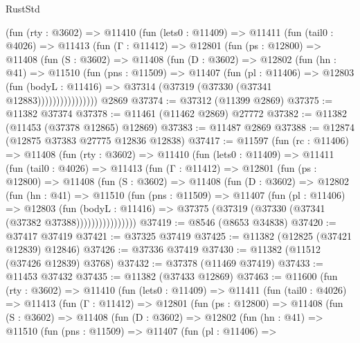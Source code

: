 \begin{lexlean}{RustStd}
\begin{coremodule}
        (fun (rty : @3602) =>
        @11410
          (fun (lets0 : @11409) =>
          @11411
            (fun (tail0 : @4026) =>
            @11413
              (fun (Γ : @11412) =>
              @12801
                (fun (ps : @12800) =>
                @11408
                  (fun (S : @3602) =>
                  @11408
                    (fun (D : @3602) =>
                    @12802
                      (fun (hn : @41) =>
                      @11510
                        (fun (pns : @11509) =>
                        @11407
                          (fun (pl : @11406) =>
                          @12803
                            (fun (bodyL : @11416) =>
                            @37314 (@37319 (@37330 (@37341 @12883))))))))))))))))
    @2869
@37374 := @37312 (@11399 @2869)
@37375 := @11382 @37374
@37378 := @11461 (@11462 @2869) @27772
@37382 := @11382 (@11453 (@37378 @12865) @12869)
@37383 := @11487 @2869
@37388 := @12874 (@12875 @37383 @27775 @12836 @12838)
@37417 := @11597
    (fun (rc : @11406) =>
    @11408
      (fun (rty : @3602) =>
      @11410
        (fun (lets0 : @11409) =>
        @11411
          (fun (tail0 : @4026) =>
          @11413
            (fun (Γ : @11412) =>
            @12801
              (fun (ps : @12800) =>
              @11408
                (fun (S : @3602) =>
                @11408
                  (fun (D : @3602) =>
                  @12802
                    (fun (hn : @41) =>
                    @11510
                      (fun (pns : @11509) =>
                      @11407
                        (fun (pl : @11406) =>
                        @12803
                          (fun (bodyL : @11416) =>
                          @37375 (@37319 (@37330 (@37341 (@37382 @37388))))))))))))))))
@37419 := @8546 (@8653 @34838)
@37420 := @37417 @37419
@37421 := @37325 @37419
@37425 := @11382 (@12825 (@37421 @12839) @12846)
@37426 := @37336 @37419
@37430 := @11382 (@11512 (@37426 @12839) @3768)
@37432 := @37378 (@11469 @37419)
@37433 := @11453 @37432
@37435 := @11382 (@37433 @12869)
@37463 := @11600
    (fun (rty : @3602) =>
    @11410
      (fun (lets0 : @11409) =>
      @11411
        (fun (tail0 : @4026) =>
        @11413
          (fun (Γ : @11412) =>
          @12801
            (fun (ps : @12800) =>
            @11408
              (fun (S : @3602) =>
              @11408
                (fun (D : @3602) =>
                @12802
                  (fun (hn : @41) =>
                  @11510
                    (fun (pns : @11509) =>
                    @11407
                      (fun (pl : @11406) =>

\end{coremodule}
\end{lexlean}

